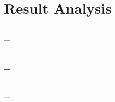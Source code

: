 
\section{Result Analysis}\label{sec:survey-results}

\subsection{--} %

\subsection{--} %

\subsection{--} %